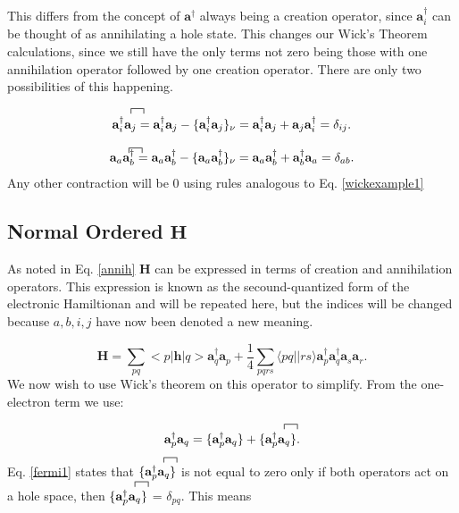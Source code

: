 \documentclass[a4paper,norsk,11pt,twoside]{report}
\begin{document}
This differs from the concept of $\textbf{a}^{\dag}$ always being a creation operator, since $\textbf{a}^{\dag}_i$ can be thought of as annihilating a hole state. This changes our Wick's Theorem calculations, since we still have the only terms not zero being those with one annihilation operator followed by one creation operator. There are only two possibilities of this happening.

\begin{equation}
\contraction{}{\textbf{a}^{\dag}_i}{}{\textbf{a}_j}
\textbf{a}^{\dag}_i \textbf{a}_j
 = \textbf{a}^{\dag}_i \textbf{a}_j
 - \{\textbf{a}^{\dag}_i \textbf{a}_j \}_{\nu} = \textbf{a}^{\dag}_i \textbf{a}_j
 +  \textbf{a}_j \textbf{a}^{\dag}_i = \delta_{ij} . \label{fermi1}
\end{equation}

\begin{equation}
\contraction{}{\textbf{a}_a}{}{\textbf{a}^{\dag}_b}
\textbf{a}_a \textbf{a}^{\dag}_b = \textbf{a}_a \textbf{a}^{\dag}_b - \{\textbf{a}_a \textbf{a}^{\dag}_b\}_{\nu} = \textbf{a}_a \textbf{a}^{\dag}_b + \textbf{a}^{\dag}_b \textbf{a}_a = \delta_{ab} . \label{fermi2}
\end{equation}
Any other contraction will be 0 using rules analogous to Eq. \eqref{wickexample1}

\subsection{Normal Ordered $\textbf{H}$}
As noted in Eq. \eqref{annih} $\textbf{H}$ can be expressed in terms of creation and annihilation operators. This expression is known as the secound-quantized form of the electronic Hamiltionan and will be repeated here, but the indices will be changed because $a,b,i,j$ have now been denoted a new meaning.

\begin{equation}
\textbf{H} = \sum_{pq} <p|\textbf{h}|q> \textbf{a}^{\dag}_q \textbf{a}_p + 
\frac{1}{4} \sum_{pqrs} \langle pq||rs \rangle \textbf{a}^{\dag}_p \textbf{a}^{\dag}_q \textbf{a}_s \textbf{a}_r .
\end{equation}
We now wish to use Wick's theorem on this operator to simplify. From the one-electron term we use:

\begin{equation}
\textbf{a}^{\dag}_p \textbf{a}_q = \{\textbf{a}^{\dag}_p \textbf{a}_q \} + \{\contraction{}{\textbf{a}^{\dag}_p}{}{\textbf{a}_q}
 \textbf{a}^{\dag}_p \textbf{a}_q 
\} . 
\end{equation}
Eq. \eqref{fermi1} states that $\{\contraction{}{\textbf{a}^{\dag}_p}{}{\textbf{a}_q}
\textbf{a}^{\dag}_p \textbf{a}_q \}$ is not equal to zero only if both operators act on a hole space, then $\{\contraction{}{\textbf{a}^{\dag}_p}{}{\textbf{a}_q}
\textbf{a}^{\dag}_p \textbf{a}_q \}$ = $\delta_{pq}$. This means 
\end{document}

